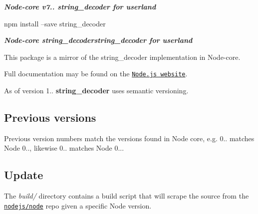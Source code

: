 {\itshape {\bfseries Node-\/core v7.. string\+\_\+decoder for userland}}

\href{https://nodei.co/npm/string_decoder/}{\tt } \href{https://nodei.co/npm/string_decoder/}{\tt }


\begin{DoxyCode}
npm install --save string\_decoder
\end{DoxyCode}


{\itshape {\bfseries Node-\/core string\+\_\+decoderstring\+\_\+decoder for userland}}

This package is a mirror of the string\+\_\+decoder implementation in Node-\/core.

Full documentation may be found on the \href{https://nodejs.org/dist/v7.8.0/docs/api/}{\tt Node.\+js website}.

As of version 1.. {\bfseries string\+\_\+decoder} uses semantic versioning.

\subsection*{Previous versions}

Previous version numbers match the versions found in Node core, e.\+g. 0.. matches Node 0.., likewise 0.. matches Node 0...

\subsection*{Update}

The {\itshape build/} directory contains a build script that will scrape the source from the \href{https://github.com/nodejs/node}{\tt nodejs/node} repo given a specific Node version. 